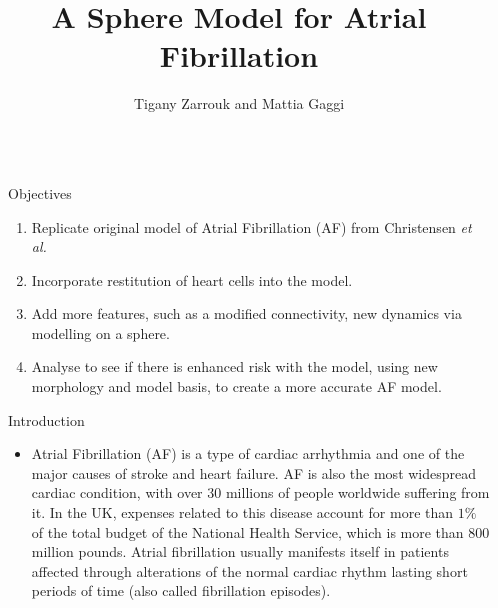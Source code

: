 \documentclass[final,hyperref={pdfpagelabels=false}]{beamer}
\title{\huge A Sphere Model for Atrial Fibrillation} %
\author{Tigany Zarrouk and Mattia Gaggi } %
\institute{Supervisor: Kim Christensen.  Condensed Matter Theory Group---Imperial College London} %
\begin{document}

\begin{frame}[t] %

\begin{columns}[t] %

\begin{column}{.02\textwidth}\end{column} %

\begin{column}{.465\textwidth} %


\begin{block}{Objectives}

\begin{enumerate}
\item Replicate original model of Atrial Fibrillation (AF) from Christensen \emph{et al.}
\item Incorporate restitution of heart cells into the model. 
\item Add more features, such as a modified connectivity, new dynamics via modelling on a sphere. 
\item Analyse to see if there is enhanced risk with the model, using new morphology and model basis, to create a more accurate AF model.
\end{enumerate}

\end{block}

            
\begin{block}{Introduction}

\begin{itemize}
\item Atrial Fibrillation (AF) is a type of cardiac arrhythmia and one of the major causes of stroke and heart failure. AF is also the most widespread cardiac condition, with over 30 millions of people worldwide suffering from it. In the UK, expenses related to this disease account for more than $1\%$ of the total budget of the National Health Service, which is more than $800$ million pounds. Atrial fibrillation usually manifests itself in patients affected through alterations of the normal cardiac rhythm lasting short periods of time (also called fibrillation episodes).\\
\end{itemize}



\end{block}
\end{column}
\end{columns}
\end{frame}
\end{document}
